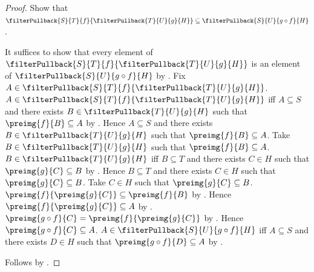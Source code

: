 \begin{proof}
    Show that $\filterPullback{S}{T}{f}{\filterPullback{T}{U}{g}{H}}
        \subseteq\filterPullback{S}{U}{g\circ f}{H}$.
    \begin{subproof}
        It suffices to show that every element of
            $\filterPullback{S}{T}{f}{\filterPullback{T}{U}{g}{H}}$ is an
            element of $\filterPullback{S}{U}{g\circ f}{H}$ by
            .
        Fix $A\in\filterPullback{S}{T}{f}{
            \filterPullback{T}{U}{g}{H}}$.
        $A\in\filterPullback{S}{T}{f}{\filterPullback{T}{U}{g}{H}}$ iff
            $A\subseteq S$ and there exists
            $B\in\filterPullback{T}{U}{g}{H}$ such that
            $\preimg{f}{B}\subseteq A$ by .
        Hence $A\subseteq S$ and there exists
            $B\in\filterPullback{T}{U}{g}{H}$ such that
            $\preimg{f}{B}\subseteq A$.
        Take $B\in\filterPullback{T}{U}{g}{H}$ such that
            $\preimg{f}{B}\subseteq A$.
        $B\in\filterPullback{T}{U}{g}{H}$ iff
            $B\subseteq T$ and there exists $C\in H$ such that
            $\preimg{g}{C}\subseteq B$ by .
        Hence $B\subseteq T$ and there exists $C\in H$ such that
            $\preimg{g}{C}\subseteq B$.
        Take $C\in H$ such that $\preimg{g}{C}\subseteq B$.
        $\preimg{f}{\preimg{g}{C}}\subseteq\preimg{f}{B}$ by
            .
        Hence $\preimg{f}{\preimg{g}{C}}\subseteq A$ by
            .
        $\preimg{g\circ f}{C}=\preimg{f}{\preimg{g}{C}}$ by
            .
        Hence $\preimg{g\circ f}{C}\subseteq A$.
        $A\in\filterPullback{S}{U}{g\circ f}{H}$ iff
            $A\subseteq S$ and there exists $D\in H$ such that
            $\preimg{g\circ f}{D}\subseteq A$ by
            .
    \end{subproof}
    Follows by .
\end{proof}


